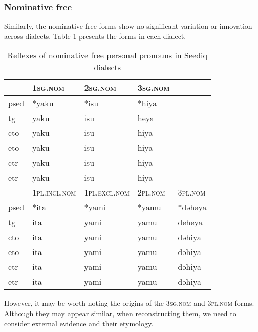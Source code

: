 \subsubsection{Nominative free}

Similarly, the nominative free forms show no significant variation or innovation across dialects. Table \ref{tab:nomfree} presents the forms in each dialect.

\begin{table}[!htbp]
\centering
\caption{Reflexes of nominative free personal pronouns in Seediq dialects}
\label{tab:nomfree}
\begin{tabular}{lllll}
\hline
      & \textsc{1sg.nom}      & \textsc{2sg.nom}      & \textsc{3sg.nom} &         \\ \hline
\acs{psed} & *yaku        & *isu         & *hiya   &         \\
\acs{tg}  & yaku         & isu          & heya    &         \\
\acs{cto}  & yaku         & isu          & hiya    &         \\
\acs{eto}  & yaku         & isu          & hiya    &         \\
\acs{ctr} & yaku         & isu          & hiya    &         \\
\acs{etr} & yaku         & isu          & hiya    &         \\ \hline
      & \textsc{1pl.incl.nom} & \textsc{1pl.excl.nom} & \textsc{2pl.nom} & \textsc{3pl.nom} \\ \hline
\acs{psed} & *ita         & *yami        & *yamu   & *dəhəya \\
\acs{tg}  & ita          & yami         & yamu    & deheya  \\
\acs{cto}  & ita          & yami         & yamu    & dəhiya  \\
\acs{eto}  & ita          & yami         & yamu    & dəhiya  \\
\acs{ctr} & ita          & yami         & yamu    & dəhiya  \\
\acs{etr} & ita          & yami         & yamu    & dəhiya  \\ \hline
\end{tabular}
\end{table}

However, it may be worth noting the origins of the \textsc{3sg.nom} and \textsc{3pl.nom} forms. Although they may appear similar, when reconstructing them, we need to consider external evidence and their etymology.

